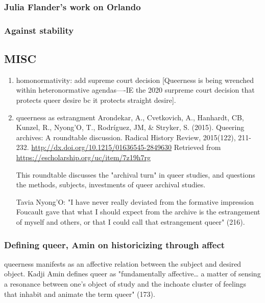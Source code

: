 \documentclass[11pt]{article}
\begin{document}
\subsubsection{Julia Flander's work on Orlando}
\label{sec:orgdabd38b}
\subsubsection{Against stability}
\label{sec:org4dde409}






\subsection{MISC}
\label{sec:org661b489}

\begin{enumerate}
\item homonormativity: add supreme court decision
\label{sec:org7652851}
[Queerness is being wrenched within heteronormative agendas----IE the
2020 surpreme court decision that protects queer desire bc it protects
straight desire].

\item queerness as estrangment
\label{sec:org58e2121}
Arondekar, A., Cvetkovich, A., Hanhardt, CB, Kunzel, R., Nyong’O, T.,
Rodríguez, JM, \& Stryker, S. (2015). Queering archives: A roundtable
discussion. Radical History Review, 2015(122),
211-232. \url{http://dx.doi.org/10.1215/01636545-2849630} Retrieved from
\url{https://escholarship.org/uc/item/7z19h7rg}

This roundtable discusses the "archival turn" in queer studies, and
questions the methods, subjects, investments of queer archival
studies. 

Tavia Nyong'O: "I have never really deviated from the formative
impression Foucault gave that what I should expect from the archive is
the estrangement of myself and others, or that I could call that
estrangement queer" (216).
\end{enumerate}

\subsubsection{Defining queer, Amin on historicizing through affect}
\label{sec:orgea12fd9}
queerness manifests as an affective relation between the
subject and desired object. Kadji Amin defines queer as "fundamentally
affective\ldots{} a matter of sensing a resonance between one's object of
study and the inchoate cluster of feelings that inhabit and animate
the term queer" (173).
\end{document}
